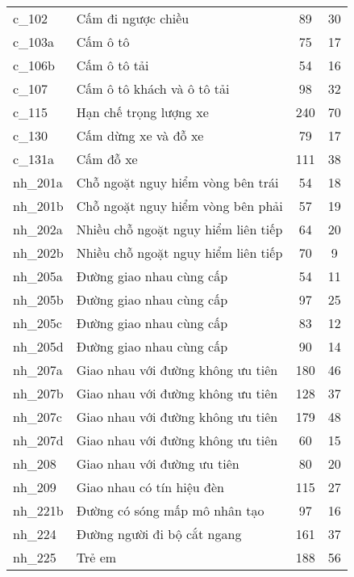 \documentclass[../thesis.tex]{subfiles}
\begin{document}
\begin{table}[!htb]
\begin{longtable}{| l | l | c | c |}
	\hline
	\thead{Nhãn} & \thead{Mô tả} & \thead{Training set} & \thead{Test set}\\
	\hline
	c\_102 & Cấm đi ngược chiều & 89 & 30\\
	\hline
	c\_103a & Cấm ô tô & 75 & 17\\
	\hline
	c\_106b & Cấm ô tô tải & 54 & 16\\
	\hline
	c\_107 & Cấm ô tô  khách và ô tô  tải & 98 & 32\\
	\hline
	c\_115 & Hạn chế trọng lượng xe & 240 & 70\\
	\hline
	c\_130 & Cấm dừng xe và đỗ xe & 79 & 17\\
	\hline
	c\_131a & Cấm đỗ xe & 111 & 38\\
	\hline
	nh\_201a & Chỗ ngoặt nguy hiểm vòng bên trái & 54 & 18\\
	\hline
	nh\_201b & Chỗ ngoặt nguy hiểm vòng bên phải & 57 & 19\\
	\hline
	nh\_202a & Nhiều chỗ ngoặt nguy hiểm liên tiếp & 64 & 20\\
	\hline
	nh\_202b & Nhiều chỗ ngoặt nguy hiểm liên tiếp & 70 & 9\\
	\hline
	nh\_205a & Đường giao nhau cùng cấp & 54 & 11\\
	\hline
	nh\_205b & Đường giao nhau cùng cấp & 97 & 25\\
	\hline
	nh\_205c & Đường giao nhau cùng cấp & 83 & 12\\
	\hline
	nh\_205d & Đường giao nhau cùng cấp & 90 & 14\\
	\hline
	nh\_207a & Giao nhau với đường không ưu tiên & 180 & 46\\
	\hline
	nh\_207b & Giao nhau với đường không ưu tiên & 128 & 37\\
	\hline
	nh\_207c & Giao nhau với đường không ưu tiên & 179 & 48\\
	\hline
	nh\_207d & Giao nhau với đường không ưu tiên & 60 & 15\\
	\hline
	nh\_208 & Giao nhau với đường ưu tiên & 80 & 20\\
	\hline
	nh\_209 & Giao nhau có tín hiệu đèn & 115 & 27\\
	\hline
	nh\_221b & Đường có sóng mấp mô nhân tạo & 97 & 16\\
	\hline
	nh\_224 & Đường người đi bộ cắt ngang & 161 & 37\\
	\hline
	nh\_225 & Trẻ em & 188 & 56\\
	\hline

\end{longtable}
\end{table}
\end{document}
